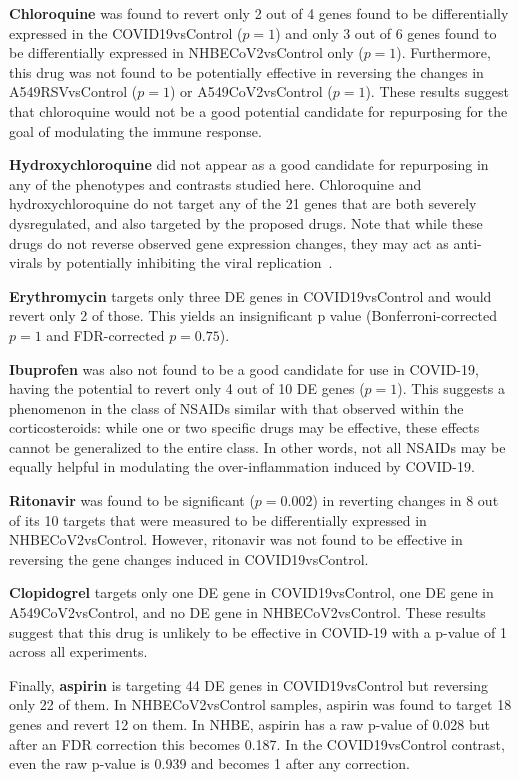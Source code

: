 \textbf{Chloroquine} was found to revert only 2 out of 4 genes found to be differentially expressed in the COVID19vsControl ($p=1$) and only 3 out of 6 genes found to be differentially expressed in NHBECoV2vsControl only ($p=1$). Furthermore, this drug was not found to be potentially effective in reversing the changes in A549RSVvsControl ($p=1$)  or A549CoV2vsControl ($p=1$). These results suggest that  chloroquine would not be a good potential candidate for repurposing for the goal of modulating the immune response.  

\textbf{Hydroxychloroquine}  did not appear as a good candidate for repurposing in any of the phenotypes and contrasts studied here. 
Chloroquine and hydroxychloroquine do not target any of the 21 genes that are both severely dysregulated, and also targeted by the proposed drugs. Note that while these drugs do not reverse observed gene expression changes, they may act as anti-virals by potentially inhibiting the viral replication~\cite{sanders2020pharmacologic}.

\textbf{Erythromycin}  targets only three DE genes in COVID19vsControl  and would revert only 2 of those. This yields an insignificant p value (Bonferroni-corrected $p=1$ and FDR-corrected $p=0.75$). 

\textbf{Ibuprofen} was also not found to be a good candidate for use in COVID-19, having the potential to revert only 4 out of 10 DE genes ($p=1$). This suggests a  phenomenon in the class of NSAIDs similar with that observed within the corticosteroids: while one or two specific drugs may be effective, 
these effects cannot be generalized to the entire class. 
In other words, not all NSAIDs may be equally helpful in modulating the over-inflammation induced by COVID-19. 

\textbf{Ritonavir} was found to be significant ($p=0.002$) in reverting changes in 8 out of its 10 targets that were measured to be differentially expressed in NHBECoV2vsControl. However, ritonavir was not found to be effective in reversing the gene changes induced in COVID19vsControl.

\textbf{Clopidogrel} targets only one DE gene in COVID19vsControl, one DE gene in A549CoV2vsControl, and no DE gene in NHBECoV2vsControl. These results suggest that this drug is unlikely to be effective in COVID-19 with a p-value of 1 across all experiments. 
 
 Finally, \textbf{aspirin}  is targeting 44  DE genes in COVID19vsControl but  reversing only 22 of them. In NHBECoV2vsControl samples, aspirin was found to target 18 genes and revert 12 on them. In NHBE, aspirin has a raw p-value of 0.028 but after an FDR correction this becomes 0.187. In the COVID19vsControl contrast, even the raw p-value is 0.939 and  becomes 1 after any correction. 
 
